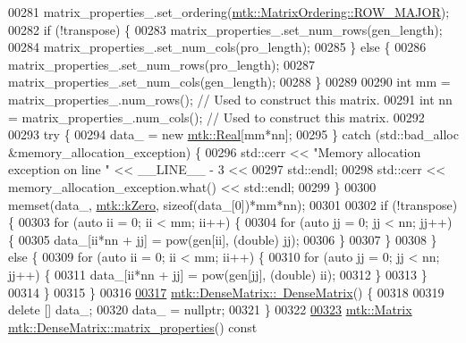 \begin{DoxyCode}
00281   matrix\_properties\_.set\_ordering(\hyperlink{namespacemtk_ga622801bd9f912d0f976c3e383f5f581ca21541962976d7709c26e9cd8385bd648}{mtk::MatrixOrdering::ROW\_MAJOR});
00282   \textcolor{keywordflow}{if} (!transpose) \{
00283     matrix\_properties\_.set\_num\_rows(gen\_length);
00284     matrix\_properties\_.set\_num\_cols(pro\_length);
00285   \} \textcolor{keywordflow}{else} \{
00286     matrix\_properties\_.set\_num\_rows(pro\_length);
00287     matrix\_properties\_.set\_num\_cols(gen\_length);
00288   \}
00289 
00290   \textcolor{keywordtype}{int} mm = matrix\_properties\_.num\_rows(); \textcolor{comment}{// Used to construct this matrix.}
00291   \textcolor{keywordtype}{int} nn = matrix\_properties\_.num\_cols(); \textcolor{comment}{// Used to construct this matrix.}
00292 
00293   \textcolor{keywordflow}{try} \{
00294     data\_ = \textcolor{keyword}{new} \hyperlink{group__c01-roots_gac080bbbf5cbb5502c9f00405f894857d}{mtk::Real}[mm*nn];
00295   \} \textcolor{keywordflow}{catch} (std::bad\_alloc &memory\_allocation\_exception) \{
00296     std::cerr << \textcolor{stringliteral}{"Memory allocation exception on line "} << \_\_LINE\_\_ - 3 <<
00297       std::endl;
00298     std::cerr << memory\_allocation\_exception.what() << std::endl;
00299   \}
00300   memset(data\_, \hyperlink{group__c01-roots_ga59a451a5fae30d59649bcda274fea271}{mtk::kZero}, \textcolor{keyword}{sizeof}(data\_[0])*mm*nn);
00301 
00302   \textcolor{keywordflow}{if} (!transpose) \{
00303     \textcolor{keywordflow}{for} (\textcolor{keyword}{auto} ii = 0; ii < mm; ii++) \{
00304       \textcolor{keywordflow}{for} (\textcolor{keyword}{auto} jj = 0; jj < nn; jj++) \{
00305         data\_[ii*nn + jj] = pow(gen[ii], (\textcolor{keywordtype}{double}) jj);
00306       \}
00307     \}
00308   \} \textcolor{keywordflow}{else} \{
00309     \textcolor{keywordflow}{for} (\textcolor{keyword}{auto} ii = 0; ii < mm; ii++) \{
00310       \textcolor{keywordflow}{for} (\textcolor{keyword}{auto} jj = 0; jj < nn; jj++) \{
00311         data\_[ii*nn + jj] = pow(gen[jj], (\textcolor{keywordtype}{double}) ii);
00312       \}
00313     \}
00314   \}
00315 \}
00316 
\hypertarget{mtk__dense__matrix_8cc_source_l00317}{}\hyperlink{classmtk_1_1DenseMatrix_a8d4a0df33bd4e4edf5d2fe5539885b85}{00317} \hyperlink{classmtk_1_1DenseMatrix_a8d4a0df33bd4e4edf5d2fe5539885b85}{mtk::DenseMatrix::~DenseMatrix}() \{
00318 
00319   \textcolor{keyword}{delete} [] data\_;
00320   data\_ = \textcolor{keyword}{nullptr};
00321 \}
00322 
\hypertarget{mtk__dense__matrix_8cc_source_l00323}{}\hyperlink{classmtk_1_1DenseMatrix_a5aa83a0643f27a4652ea97630edf7143}{00323} \hyperlink{classmtk_1_1Matrix}{mtk::Matrix} \hyperlink{classmtk_1_1DenseMatrix_a5aa83a0643f27a4652ea97630edf7143}{mtk::DenseMatrix::matrix\_properties}() const 

\end{DoxyCode}
